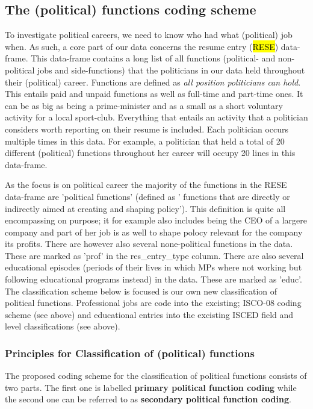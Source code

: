 \documentclass{article}
\begin{document}
\newpage
\subsection{The (political) functions coding scheme}

To investigate political careers, we need to know who had what (political) job when. As such, a core part of our data concerns the resume entry (\hl{RESE}) data-frame. This data-frame contains a long list of all functions (political- and non-political jobs and side-functions) that the politicians in our data held throughout their (political) career. Functions are defined as \textit{all position politicians can hold}. This entails paid and unpaid functions as well as full-time and part-time ones. It can be as big as being a prime-minister and as a small as a short voluntary activity for a local sport-club. Everything that entails an activity that a politician considers worth reporting on their resume is included. Each politician occurs multiple times in this data. For example, a politician that held a total of 20 different (political) functions throughout her career will occupy 20 lines in this data-frame.

As the focus is on political career the majority of the functions in the RESE data-frame are 'political functions' (defined as ' functions that are directly or indirectly aimed at creating and shaping policy'). This definition is quite all encompassing on purpose; it for example also includes being the CEO of a largere company and part of her job is as well to shape polocy relevant for the company its profits. There are however also several none-political functions in the data. These are marked as 'prof' in the res\_entry\_type column. There are also several educational episodes (periods of their lives in which MPs where not working but following educational programs instead) in the data. These are marked as 'educ'. The classification scheme below is focused is our own new classification of political functions. Professional jobs are code into the excisting; ISCO-08 coding scheme (see above) and educational entries into the excisting ISCED field and level classifications (see above).

    \subsubsection{Principles for Classification of (political) functions}
    
     The proposed coding scheme for the classification of political functions consists of two parts. The first one is labelled \textbf{primary political function coding} while the second one can be referred to as \textbf{secondary political function coding}. 
\end{document}
